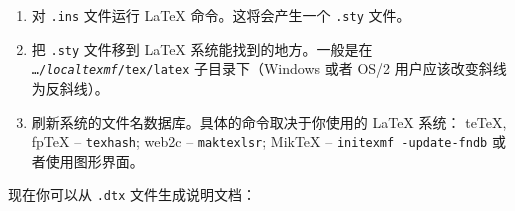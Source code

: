 
\begin{enumerate}
\item 对 \texttt{.ins} 文件运行 \LaTeX{} 命令。这将会产生一个 \texttt{.sty} 文件。
\item 把 \texttt{.sty} 文件移到 \LaTeX{} 系统能找到的地方。一般是在 
      \texttt{\ldots/\emph{localtexmf}/tex/latex} 子目录下（Windows 或者 OS/2 用户应该改变斜线为反斜线）。
\item 刷新系统的文件名数据库。具体的命令取决于你使用的 \LaTeX{} 系统：
       teTeX, fpTeX -- \texttt{texhash}; web2c -- \texttt{maktexlsr};
      MikTeX -- \texttt{initexmf -update-fndb} 或者使用图形界面。
\end{enumerate}


\noindent 现在你可以从 \texttt{.dtx} 文件生成说明文档：

%
%

